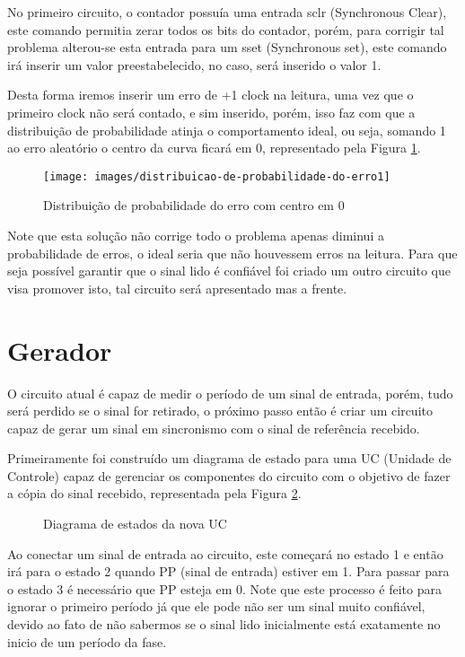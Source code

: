 \documentclass[12pt,a4paper,openany]{abntex2}
\begin{document}
No primeiro circuito, o contador possuía uma entrada sclr (Synchronous Clear), este comando permitia zerar todos os bits do contador, porém, para corrigir tal problema alterou-se esta entrada para um sset (Synchronous set), este comando irá inserir um valor preestabelecido, no caso, será inserido o valor 1.

Desta forma iremos inserir um erro de +1 clock na leitura, uma vez que o primeiro clock não será contado, e sim inserido, porém, isso faz com que a distribuição de probabilidade atinja o comportamento ideal, ou seja, somando 1 ao erro aleatório o centro da curva ficará em 0, representado pela Figura \ref{fig:distribuicao-de-probabilidade-do-erro1}.

\begin{figure}[!htp]
	\centering
	\caption{Distribuição de probabilidade do erro com centro em 0}
	\texttt{[image: images/distribuicao-de-probabilidade-do-erro1]}
	\label{fig:distribuicao-de-probabilidade-do-erro1}
\end{figure}

Note que esta solução não corrige todo o problema apenas diminui a probabilidade de erros, o ideal seria que não houvessem erros na leitura. Para que seja possível garantir que o sinal lido é confiável foi criado um outro circuito que visa promover isto, tal circuito será apresentado mas a frente.

\section{Gerador}

O circuito atual é capaz de medir o período de um sinal de entrada, porém, tudo será perdido se o sinal for retirado, o próximo passo então é criar um circuito capaz de gerar um sinal em sincronismo com o sinal de referência recebido. 

Primeiramente foi construído um diagrama de estado para uma UC (Unidade de Controle) capaz de gerenciar os componentes do circuito com o objetivo de fazer a cópia do sinal recebido, representada pela Figura \ref{fig:diagrama-de-estado1}.

\begin{figure}[!htp]
	\centering
	\caption{Diagrama de estados da nova UC}
	\label{fig:diagrama-de-estado1}
\end{figure}

Ao conectar um sinal de entrada ao circuito, este começará no estado 1 e então irá para o estado 2 quando PP (sinal de entrada) estiver em 1. Para passar para o estado 3 é necessário que PP esteja em 0. Note que este processo é feito para ignorar o primeiro período já que ele pode não ser um sinal muito confiável, devido ao fato de não sabermos se o sinal lido inicialmente está exatamente no inicio de um período da fase.
\end{document}
